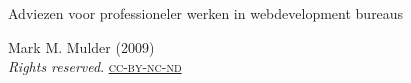 \thispagestyle{empty}

\begin{flushleft}

  \Huge
  Adviezen voor professioneler werken in webdevelopment bureaus\\

  \vfill{}
  
  \small
  Mark M. Mulder (2009) \\\emph{Rights reserved}.
  \href{http://creativecommons.org/licenses/by-nc-nd/3.0/nl/}{\textsc{cc-by-nc-nd}}
  
\end{flushleft}

\normalsize
